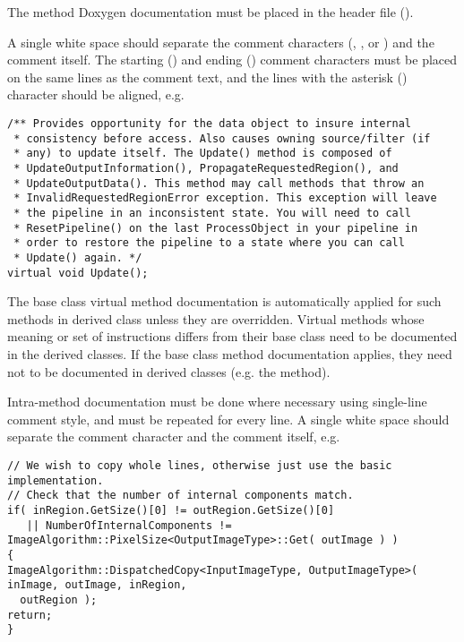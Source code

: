 The method Doxygen documentation must be placed in the header file ().

A single white space should separate the comment characters (\code{/**},
\code{*}, or \code{*/}) and the comment itself. The starting (\code{/**})
and ending (\code{*/}) comment characters must be placed on the same lines
as the comment text, and the lines with the asterisk (\code{*}) character
should be aligned, e.g.

\small
\begin{verbatim}
/** Provides opportunity for the data object to insure internal
 * consistency before access. Also causes owning source/filter (if
 * any) to update itself. The Update() method is composed of
 * UpdateOutputInformation(), PropagateRequestedRegion(), and
 * UpdateOutputData(). This method may call methods that throw an
 * InvalidRequestedRegionError exception. This exception will leave
 * the pipeline in an inconsistent state. You will need to call
 * ResetPipeline() on the last ProcessObject in your pipeline in
 * order to restore the pipeline to a state where you can call
 * Update() again. */
virtual void Update();
\end{verbatim}
\normalsize

The base class virtual method documentation is automatically applied for such
methods in derived class unless they are overridden. Virtual methods whose
meaning or set of instructions differs from their base class need to be
documented in the derived classes. If the base class method documentation
applies, they need not to be documented in derived classes (e.g. the
 method).

Intra-method documentation must be done where necessary using single-line comment
style, and must be repeated for every line. A single white space should separate
the comment character \code{//} and the comment itself, e.g.

\small
\begin{verbatim}
// We wish to copy whole lines, otherwise just use the basic implementation.
// Check that the number of internal components match.
if( inRegion.GetSize()[0] != outRegion.GetSize()[0]
   || NumberOfInternalComponents != ImageAlgorithm::PixelSize<OutputImageType>::Get( outImage ) )
{
ImageAlgorithm::DispatchedCopy<InputImageType, OutputImageType>( inImage, outImage, inRegion,
  outRegion );
return;
}
\end{verbatim}
\normalsize

